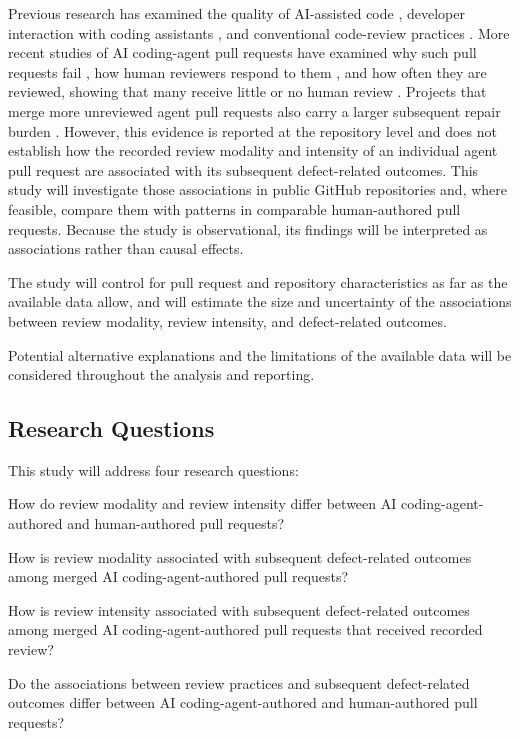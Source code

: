 \documentclass[stu,12pt,donotrepeattitle]{apa7}
\begin{document}
Previous research has examined the quality of AI-assisted code \parencite{liu2024,nguyen2022}, developer interaction with coding assistants \parencite{barke2023,perry2023}, and conventional code-review practices \parencite{mcintosh2016}. More recent studies of AI coding-agent pull requests have examined why such pull requests fail \parencite{ehsani2026}, how human reviewers respond to them \parencite{watanabe2026}, and how often they are reviewed, showing that many receive little or no human review \parencite{duma2026}. Projects that merge more unreviewed agent pull requests also carry a larger subsequent repair burden \parencite{xia2026}. However, this evidence is reported at the repository level and does not establish how the recorded review modality and intensity of an individual agent pull request are associated with its subsequent defect-related outcomes. This study will investigate those associations in public GitHub repositories and, where feasible, compare them with patterns in comparable human-authored pull requests. Because the study is observational, its findings will be interpreted as associations rather than causal effects.

The study will control for pull request and repository characteristics as far as the available data allow, and will estimate the size and uncertainty of the associations between review modality, review intensity, and defect-related outcomes.

Potential alternative explanations and the limitations of the available data will be considered throughout the analysis and reporting.

\subsection{Research Questions}

This study will address four research questions:

\begin{description}[leftmargin=0pt,style=unboxed,labelsep=0.5em]
  \item[RQ1:] How do review modality and review intensity differ between AI coding-agent-authored and human-authored pull requests?
  \item[RQ2:] How is review modality associated with subsequent defect-related outcomes among merged AI coding-agent-authored pull requests?
  \item[RQ3:] How is review intensity associated with subsequent defect-related outcomes among merged AI coding-agent-authored pull requests that received recorded review?
  \item[RQ4:] Do the associations between review practices and subsequent defect-related outcomes differ between AI coding-agent-authored and human-authored pull requests?
\end{description}
\end{document}
